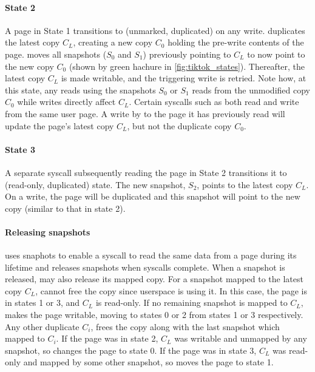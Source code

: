 \documentclass[letterpaper,twocolumn,10pt, anonymous]{article}
\begin{document}
\paragraph{State 2}
A page in State 1 transitions to (unmarked, duplicated) on any write.
\tiktok duplicates the latest copy $C_L$, creating a new copy $C_0$ holding
the pre-write contents of the page.
\tiktok moves all snapshots ($S_0$ and $S_1$) previously pointing to 
$C_L$ to now point to the new copy $C_0$ (shown by green hachure in 
\autoref{fig:tiktok_states}). 
Thereafter, the latest copy $C_L$ is made writable, and the triggering write 
is retried. 
Note how, at this state, any reads using the snapshots $S_0$ or $S_1$ reads 
from the unmodified copy $C_0$ while writes directly affect $C_L$.
Certain syscalls such as  both read and write from 
the same user page. 
A write by  to the page it has previously read will update
the page's latest copy $C_L$, but not the duplicate copy $C_0$.

\paragraph{State 3}
A separate syscall subsequently reading the page in State 2 transitions 
it to (read-only, duplicated) state. 
The new snapshot, $S_2$, points to the latest copy $C_L$.
On a write, the page will be duplicated and this snapshot 
will point to the new copy (similar to that in state 2).

\paragraph{Releasing snapshots}
\tiktok uses snaphots to enable a syscall to read the same data from a page 
during its lifetime and releases snapshots when syscalls complete. 
When a snapshot is released, \tiktok may also release its mapped copy.
For a snapshot mapped to the latest copy $C_L$, \tiktok cannot free the copy
since userspace is using it.
In this case, the page is in states 1 or 3, and $C_L$ is read-only.
If no remaining snapshot is mapped to $C_L$, \tiktok makes the 
page writable, moving to states 0 or 2 from states 1 or 3 respectively. 
Any other duplicate $C_i$, \tiktok frees the copy along with the 
last snapshot which mapped to $C_i$.
If the page was in state 2, $C_L$ was writable and unmapped by any snapshot,
so \tiktok changes the page to state 0.
If the page was in state 3, $C_L$ was read-only and mapped by some other
snapshot, so \tiktok moves the page to state 1.
\end{document}

